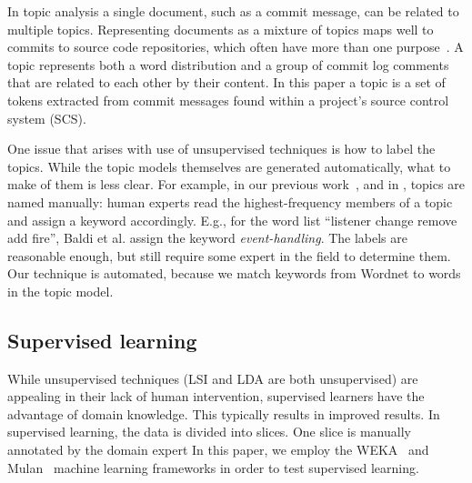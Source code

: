 \documentclass{acm_proc_article-sp}
\begin{document}
In topic analysis a single document, such as a commit message, can be related to multiple topics. Representing documents as a mixture of topics maps well to commits to source code repositories, which often have more than one purpose~\cite{Hindle09ICSM}.  A topic represents both a word distribution and a group of commit log comments that are related to each other by their content.  In this paper a topic is a set of tokens extracted from commit messages found within a project's source control system (SCS).

One issue that arises with use of unsupervised techniques is how to label the topics. While the topic models themselves are generated automatically, what to make of them is less clear. For example, in our previous work~\cite{Hindle09ICSM}, and in \cite{Baldi2008}, topics are named manually: human experts read the highest-frequency members of a topic and assign a keyword accordingly. E.g., for the word list ``listener change remove add fire'', Baldi et al. assign the keyword \emph{event-handling}. The labels are reasonable enough, but still require some expert in the field to determine them. Our technique is automated, because we match keywords from Wordnet to words in the topic model. 

\subsection{Supervised learning}
While unsupervised techniques (LSI and LDA are both unsupervised) are appealing in their lack of human intervention, supervised learners have the advantage of domain knowledge. This typically results in improved results. In supervised learning, the data is divided into slices. One slice is manually annotated by the domain expert
In this paper, we employ the WEKA~\cite{weka09} and Mulan~\cite{mulan} machine learning frameworks in order to test supervised learning.
 
\end{document}
